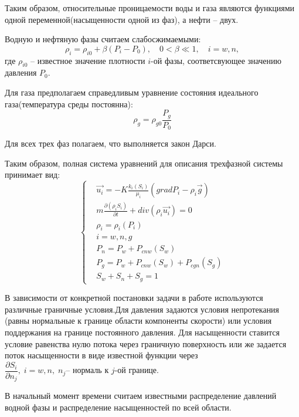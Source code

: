 Таким образом, относительные проницаемости воды и газа являются функциями одной 
переменной(насыщенности одной
из фаз), а нефти -- двух.

Водную и нефтяную фазы считаем слабосжимаемыми:\\
$${\rho}_i = {\rho}_{i0} + {\beta}(P_i-P_0),{\quad}0<{\beta}{\ll}1,{\quad}i=w,n,$$
где ${\rho}_{i0}$ -- известное значение плотности $i$-ой фазы, соответсвующее
значению давления $P_0$.

Для газа предполагаем справедливым уравнение состояния идеального
газа(температура среды постоянна):
$${\rho}_g = {\rho}_{g0}{\frac{P_g}{P_0}}$$

Для всех трех фаз полагаем, что выполняется закон Дарси.

Таким образом, полная система уравнений для описания трехфазной системы
принимает вид:
\begin{equation}
\left\{
  \begin{aligned}
    &\overrightarrow{u_i}=-K \frac{k_i(S_i)}{{\mu}_i}(grad P_i - {\rho}_i\overrightarrow{g})\\
    &m\frac{\partial (\rho_i S_i)}{\partial t}+ div(\rho_i \overrightarrow{u_i}) = 0 \\
    &{\rho}_i = {\rho}_i(P_i) \\
    &i=w,n,g\\
    &P_n=P_w+P_{cnw}(S_w)\\
    &P_g=P_w+P_{cnw}(S_w)+P_{cgn}(S_g)\\
    &S_w + S_n + S_g=1
  \end{aligned}
\right.
\end{equation}

В зависимости от конкретной постановки задачи в работе используются различные
граничные условия.Для давления задаются условия непротекания (равны нормальные 
к границе области компоненты скорости) или условия поддержания на границе постоянного
давления. Для насыщенности ставится условие равенства нулю потока через граничную 
поверхность или же задается поток насыщенности в виде известной функции через 
$ \dfrac{\partial S_i}{\partial n_j}, \; i=w,n, \;  n_j \text{-- нормаль к $j$-ой границе} $.

В начальный момент времени считаем известными распределение давлений водной 
фазы и распределение насыщенностей по всей области.
